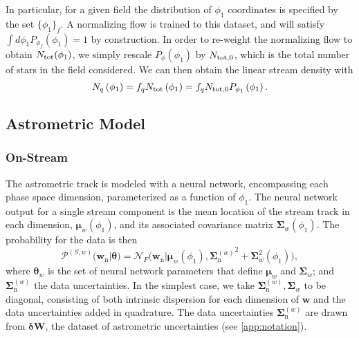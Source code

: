 \documentclass[twocolumn]{aastex631}
\newcommand{\mrm}[1]{\mathrm{#1}}
\newcommand{\mbs}[1]{\boldsymbol{#1}}
\newcommand{\mbf}[1]{\mathbf{#1}}
\newcommand{\mcal}[1]{\mathcal{#1}}
\newcommand{\pdf}{\mcal{P}}
\newcommand{\nth}[1]{{#1}_{\mrm{n}}}  %
\newcommand{\smallcomponent}[2]{#2^{\scriptscriptstyle (#1)}}
\newcommand{\cmp}[2]{\smallcomponent{#1}{#2}}
\newcommand{\astroM}[1]{{#1}_w}
\begin{document}
        In particular, for a given field the distribution of $\phi_1$
        coordinates is specified by the set $\{\phi_1\}_f$. A normalizing flow is
        trained to this dataset, and will satisfy $\int d\phi_1
        P_{\phi_f}(\phi_1) = 1$ by construction. In order to re-weight the
        normalizing flow to obtain $N_{\rm tot}(\phi_1)$, we simply rescale
        $P_{\phi}(\phi_1)$ by $N_{\rm tot,0}$, which is the total number of
        stars in the field considered. We can then obtain the linear stream
        density with
        \begin{equation}
            N_q\left(\phi_1\right) = f_q N_{\rm tot} \left(\phi_1\right)  = f_q N_{\rm tot,0} P_{\phi_1}\left(\phi_1\right) .
        \end{equation}

    
        
    \subsection{Astrometric Model} \label{sub:method:astrometric_model}

        \subsubsection{On-Stream} \label{ssub:method:astrometric_model:on_stream}
    
            The astrometric track is modeled with a neural network, encompassing
            each phase space dimension, parameterized as a function of $\phi_1$.
            The neural network output for a single stream component is the mean
            location of the stream track in each dimension,
            $\astroM{\mbs{\mu}}(\phi_1)$, and its associated covariance matrix
            $\astroM{\mbs{\Sigma}}(\phi_1)$. The probability for the data is
            then
            \begin{equation}
                \cmp{S,w}{\pdf}(\nth{\mbs{w}} | \mbs{\theta})
                \!= \mcal{N}_F \big(\nth{\mbs{w}} | \astroM{\mbs{\mu}}\!(\phi_1), {\cmp{w}{\nth{\mbs{\Sigma}}}}^2 \! + \!  \astroM{\mbs{\Sigma}}^2\!\left(\phi_1\right) \!\big),
            \end{equation}
            where $\astroM{\mbs{\theta}}$ is the set of neural network
            parameters that define $\astroM{\mbs{\mu}}$ and
            $\astroM{\mbs{\Sigma}}$; and $\cmp{w}{\nth{\mbs{\Sigma}}}$ the data
            uncertainties.  In the simplest case, we take
            $\cmp{w}{\nth{\mbs{\Sigma}}}, \astroM{\mbs{\Sigma}}$ to be diagonal,
            consisting of both intrinsic dispersion for each dimension of
            $\mbs{w}$ and the data uncertainties added in quadrature. The data
            uncertainties $\cmp{w}{\nth{\mbs{\Sigma}}}$ are drawn from
            $\mbs{\delta}\mbf{W}$, the dataset of astrometric uncertainties (see
            \autoref{app:notation}).
\end{document}
